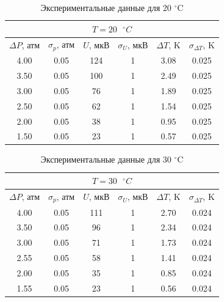 \documentclass[a4paper,12pt]{article} %
\begin{document}
\begin{table}[H]
	\centering
	\begin{tabular}{|c|c|c|c|c|c|}
		\hline
		\multicolumn{6}{|c|}{$ T = 20 \text{ } ^\circ C $} \\ \hline
		$ \Delta P $, атм & $ \sigma_p $, атм & $ U $, мкВ & $ \sigma_U $, мкВ & $ \Delta T $, K & $ \sigma_{\Delta T} $, K \\ \hline
    		4.00 & 0.05 & 124 & 1 & 3.08 & 0.025 \\ \hline
            3.50 & 0.05 & 100 & 1 & 2.49 & 0.025 \\ \hline
            3.00 & 0.05 & 76  & 1 & 1.89 & 0.025 \\ \hline
            2.50 & 0.05 & 62  & 1 & 1.54 & 0.025 \\ \hline
            2.00 & 0.05 & 38  & 1 & 0.95 & 0.025 \\ \hline
            1.50 & 0.05 & 23  & 1 & 0.57 & 0.025 \\ \hline
	\end{tabular}
	\caption{Экспериментальные данные для 20 $^\circ$C}
	\label{tab:20C}
\end{table}

\begin{table}[H]
	\centering
	\begin{tabular}{|c|c|c|c|c|c|}
		\hline
		\multicolumn{6}{|c|}{$ T = 30 \text{ } ^\circ C $} \\ \hline
		$ \Delta P $, атм & $ \sigma_p $, атм & $ U $, мкВ & $ \sigma_U $, мкВ & $ \Delta T $, K & $ \sigma_{\Delta T} $, K \\ \hline
		4.00 & 0.05 & 111 & 1 & 2.70  & 0.024 \\ \hline
        3.50 & 0.05 & 96  & 1 & 2.34  & 0.024 \\ \hline
        3.00 & 0.05 & 71  & 1 & 1.73  & 0.024 \\ \hline
        2.55 & 0.05 & 58  & 1 & 1.41  & 0.024 \\ \hline
        2.00 & 0.05 & 35  & 1 & 0.85  & 0.024 \\ \hline
        1.55 & 0.05 & 23  & 1 & 0.56  & 0.024 \\ \hline
	\end{tabular}
	\caption{Экспериментальные данные для 30 $^\circ$C}
	\label{tab:30C}
\end{table}
\end{document}
